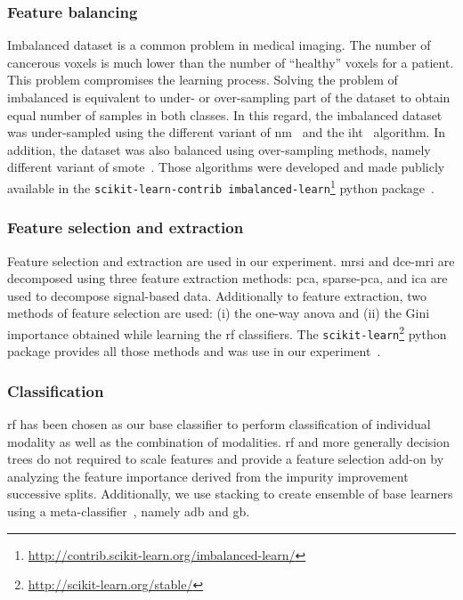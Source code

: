 \documentclass[conference]{sty/ieeeconf}
\begin{document}
\subsubsection{Feature balancing}\label{subsec:chp6:method:fea-bal}
Imbalanced dataset is a common problem in medical imaging.
The number of cancerous voxels is much lower than the number of
``healthy'' voxels for a patient.
This problem compromises the learning process.
Solving the problem of imbalanced is equivalent to under- or
over-sampling part of the dataset to obtain equal number of samples
in both classes.
In this regard, the imbalanced dataset was under-sampled using the different
variant of \ac{nm}~\cite{mani2003knn} and the \ac{iht}~\cite{smith2014instance}
algorithm.
In addition, the dataset was also balanced using over-sampling methods, namely
different variant of \ac{smote}~\cite{chawla2002smote,han2005borderline}.
Those algorithms were developed and made publicly available in the
\texttt{scikit-learn-contrib
  imbalanced-learn}\footnote{\url{http://contrib.scikit-learn.org/imbalanced-learn/}}
python package~\cite{imblearn}.

\subsubsection{Feature selection and extraction}\label{subsec:chp6:method:fea-sel}

Feature selection and extraction are used in our experiment.
\ac{mrsi} and \ac{dce}-\ac{mri} are decomposed using three feature
extraction methods: \ac{pca}, sparse-\ac{pca}, and \ac{ica} are used
to decompose signal-based data.
Additionally to feature extraction, two methods of feature selection
are used: (i) the one-way \ac{anova} and (ii) the Gini importance
obtained while learning the \ac{rf} classifiers.
The \texttt{scikit-learn}\footnote{\url{http://scikit-learn.org/stable/}}
python package provides all those methods and was use in our
experiment~\cite{pedregosa2011scikit}.

\subsubsection{Classification}\label{subsec:chp6:method:clas}

\ac{rf} has been chosen as our base classifier to perform classification of
individual modality as well as the combination of modalities.
\ac{rf} and more generally decision trees do not required to scale features and
provide a feature selection add-on by analyzing the feature importance derived
from the impurity improvement successive splits.
Additionally, we use stacking to create ensemble of base learners using a
meta-classifier~\cite{wolpert1992stacked}, namely \ac{adb} and \ac{gb}.
\end{document}

